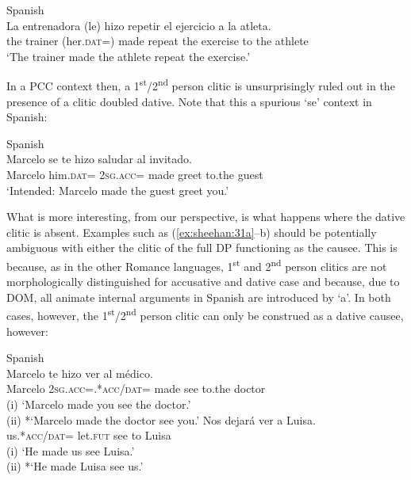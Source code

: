 \documentclass[output=paper,colorlinks,citecolor=brown,nonflat]{langsci/langscibook}
\begin{document}
\ea%
    \label{ex:sheehan:29}
    Spanish \citep[448]{Torrego2010}\\
    \gll    La   entrenadora  (le)   hizo   repetir  el   ejercicio   a     la   atleta.\\
            the   trainer   (her.\textsc{dat}=)   made   repeat  the   exercise   to   the  athlete\\
    \glt    ‘The trainer made the athlete repeat the exercise.’
\z

In a PCC context then, a 1\textsuperscript{st}/2\textsuperscript{nd} person clitic is unsurprisingly ruled out in the presence of a clitic doubled dative. Note that this a spurious ‘se’ context in Spanish:

\ea%
    \label{ex:sheehan:30}
    Spanish\\
    \gll    *Marcelo   se   te   hizo   saludar  al   invitado.\\
            Marcelo   him.\textsc{dat}=  \textsc{2sg}.\textsc{acc}=  made   greet  to.the   guest\\
    \glt    ‘Intended: Marcelo made the guest greet you.’
\z

What is more interesting, from our perspective, is what happens where the dative clitic is absent. Examples such as (\ref{ex:sheehan:31a}--b) should be potentially ambiguous with either the clitic of the full DP functioning as the causee. This is because, as in the other Romance languages, 1\textsuperscript{st} and 2\textsuperscript{nd} person clitics are not morphologically distinguished for accusative and dative case and because, due to DOM, all animate internal arguments in Spanish are introduced by ‘a’.  In both cases, however, the 1\textsuperscript{st}/2\textsuperscript{nd} person clitic can only be construed as a dative causee, however:

\ea%
    \label{ex:sheehan:31}
    Spanish\\
    \ea\label{ex:sheehan:31a}
    \gll    Marcelo   te     hizo     ver   al   médico.\\
            Marcelo   2\textsc{sg}.\textsc{acc}=.*\textsc{acc/dat=}  made  see     to.the   doctor\\
    \glt    (i) ‘Marcelo made you see the doctor.’\\
            (ii) *‘Marcelo made the doctor see you.’
    \ex\label{ex:sheehan:31b}
    \gll    Nos  dejará   ver   a   Luisa.\\
            us.*\textsc{acc/dat=}   let.\textsc{fut}  see   to   Luisa\\
    \glt    (i) ‘He made us see Luisa.’\\
            (ii) *‘He made Luisa see us.’
    \z
\z
\end{document}
